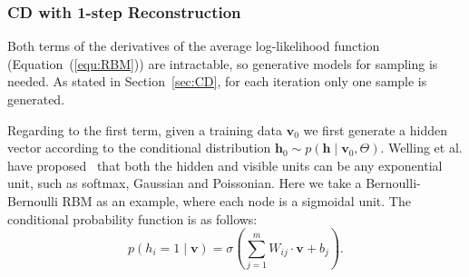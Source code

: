 \subsubsection{CD with 1-step Reconstruction}
\label{sec:cd}
	Both terms of the derivatives of the average log-likelihood function (Equation~(\ref{equ:RBM})) are intractable, so generative models for sampling is needed.
	As stated in Section~\ref{sec:CD}, for each iteration only one sample is generated.
	
	Regarding to the first term, given a training data $ \mathbf{v}_0 $ we first generate a hidden vector according to the conditional distribution $ \mathbf{h}_0 \sim p( \mathbf{h} \mid \mathbf{v}_0, \Theta) $.
	Welling et al. have proposed~\cite{welling2004exponential} that both the hidden and visible units can be any exponential unit, such as softmax, Gaussian and Poissonian.
	Here we take a Bernoulli-Bernoulli RBM as an example, where each node is a sigmoidal unit.
	The conditional probability function is as follows:
	\begin{equation}
		p(h_i = 1 \mid \mathbf{v}) = \sigma(\sum_{j=1}^{m} W_{ij} \cdot \mathbf{v} + b_j).
	\end{equation}
	

